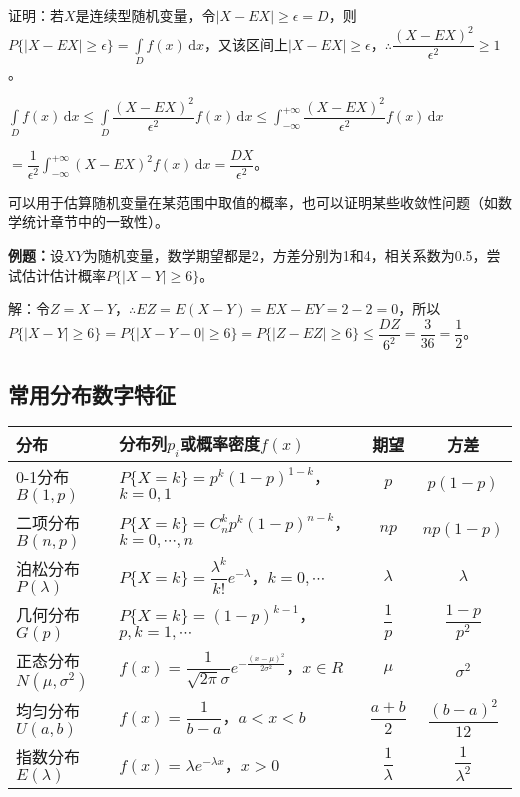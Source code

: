 \documentclass[UTF8, 12pt]{ctexart}
\begin{document}
证明：若$X$是连续型随机变量，令$\vert X-EX\vert\geqslant\epsilon=D$，则$P\{\vert X-EX\vert\geqslant\epsilon\}=\int\limits_Df(x)\,\textrm{d}x$，又该区间上$\vert X-EX\vert\geqslant\epsilon$，$\therefore\dfrac{(X-EX)^2}{\epsilon^2}\geqslant 1$。

$\displaystyle{\int\limits_Df(x)\,\textrm{d}x\leqslant\int\limits_D\dfrac{(X-EX)^2}{\epsilon^2}f(x)\,\textrm{d}x\leqslant\int_{-\infty}^{+\infty}\dfrac{(X-EX)^2}{\epsilon^2}f(x)\,\textrm{d}x}$

$=\displaystyle{\dfrac{1}{\epsilon^2}\int_{-\infty}^{+\infty}(X-EX)^2f(x)\,\textrm{d}x}=\dfrac{DX}{\epsilon^2}$。

可以用于估算随机变量在某范围中取值的概率，也可以证明某些收敛性问题（如数学统计章节中的一致性）。

\textbf{例题：}设$XY$为随机变量，数学期望都是2，方差分别为1和4，相关系数为0.5，尝试估计估计概率$P\{\vert X-Y\vert\geqslant6\}$。

解：令$Z=X-Y$，$\therefore EZ=E(X-Y)=EX-EY=2-2=0$，所以$P\{\vert X-Y\vert\geqslant6\}=P\{\vert X-Y-0\vert\geqslant6\}=P\{\vert Z-EZ\vert\geqslant6\}\leqslant\dfrac{DZ}{6^2}=\dfrac{3}{36}=\dfrac{1}{2}$。

\subsection{常用分布数字特征}

\begin{center}
    \begin{tabular}{|m{50pt}<{\centering}|m{220pt}<{\centering}|c|c|}
        \hline
        分布 & 分布列$p_i$或概率密度$f(x)$ & 期望 & 方差 \\ \hline
        0-1分布$B(1,p)$ & $P\{X=k\}=p^k(1-p)^{1-k}$，$k=0,1$ & $p$ & $p(1-p)$ \\ \hline
        二项分布$B(n,p)$ & $P\{X=k\}=C_n^kp^k(1-p)^{n-k}$，$k=0,\cdots,n$ & $np$ & $np(1-p)$ \\ \hline
        泊松分布$P(\lambda)$ & $P\{X=k\}=\dfrac{\lambda^k}{k!}e^{-\lambda}$，$k=0,\cdots$ & $\lambda$ & $\lambda$ \\ \hline
        几何分布$G(p)$ & $P\{X=k\}=(1-p)^{k-1}$，$p,k=1,\cdots$ & $\dfrac{1}{p}$ & $\dfrac{1-p}{p^2}$ \\ \hline
        正态分布$N(\mu,\sigma^2)$ & $f(x)=\dfrac{1}{\sqrt{2\pi}\sigma}e^{-\frac{(x-\mu)^2}{2\sigma^2}}$，$x\in R$ & $\mu$ & $\sigma^2$ \\ \hline
        均匀分布$U(a,b)$ & $f(x)=\dfrac{1}{b-a}$，$a<x<b$ & $\dfrac{a+b}{2}$ & $\dfrac{(b-a)^2}{12}$ \\ \hline
        指数分布$E(\lambda)$ & $f(x)=\lambda e^{-\lambda x}$，$x>0$ & $\dfrac{1}{\lambda}$ & $\dfrac{1}{\lambda^2}$ \\ \hline
    \end{tabular}
\end{center}
\end{document}
